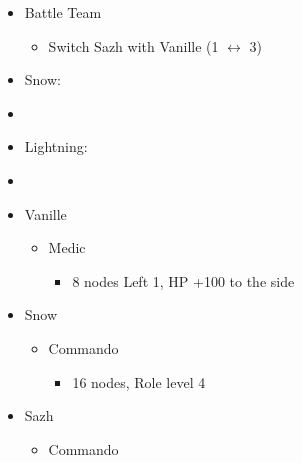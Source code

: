 \begin{multicols}{2}
\begin{menu}
\begin{itemize}
    \paradigm
    \begin{itemize}
        \item Battle Team
        \begin{itemize}
            \item Switch Sazh with Vanille (1 $\leftrightarrow$ 3)
        \end{itemize}
        \item Snow:
        \item {}%
{\paradigmline{(\med)}{\com}{(\com)}}%
{\paradigmline{(\sab)}{\com}{\com}}%
{\paradigmline{(\sab)}{\sen}{(\syn)}}%
{\paradigmline{(\rav)}{(\rav)}{(\syn)}}%
{\paradigmline[5]{\textit{(\sab)}}{\textit{(\rav)}}{\textit{\rav}}}%
{\paradigmline{\rav}{\rav}{\rav}}
	\item Lightning:
        \item {}%
{\paradigmline{(\rav)}{(\rav)}{(\syn)}}%
{\paradigmline{\rav}{\rav}{\rav}}
{\paradigmline{(\sab)}{\sen}{(\syn)}}%
{\paradigmline{(\sab)}{\com}{\com}}%
{\paradigmline{(\med)}{\com}{(\com)}}%
{\paradigmline[6]{\textit{(\sab)}}{\textit{(\rav)}}{\textit{\rav}}}
    \end{itemize}
    \crystarium
    \begin{itemize}
        \item Vanille
        \begin{itemize}
            \item Medic
            \begin{itemize}
            	\item 8 nodes Left 1, HP +100 to the side
            \end{itemize}
        \end{itemize}
        \item Snow
        \begin{itemize}
            \item Commando
            \begin{itemize}
                \item 16 nodes, Role level 4
            \end{itemize}
        \end{itemize}
        \item Sazh
        \begin{itemize}
            \item Commando

\end{itemize}
\end{itemize}
\end{itemize}
\end{menu}
\end{multicols}
